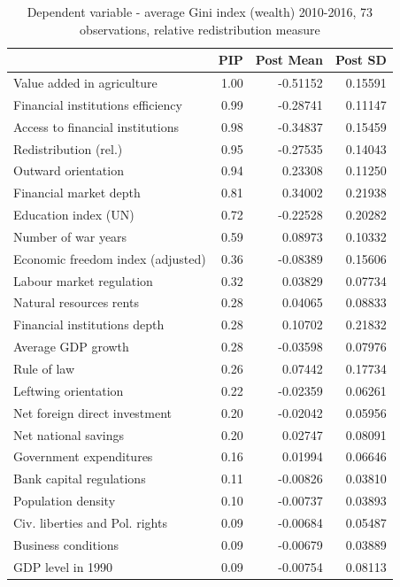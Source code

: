 \documentclass[a4paper,11pt]{article}
\begin{document}
\begin{table}[!ht]
\footnotesize
\centering
\caption{Dependent variable - average Gini index (wealth) 2010-2016, 73 observations, relative redistribution measure}
\label{table:relred}
\begin{tabular}{lrrr}
  \toprule
 & PIP & Post Mean & Post SD \\ 
  \midrule
  Value added in agriculture & 1.00 & -0.51152 & 0.15591 \\ 
  Financial institutions efficiency & 0.99 & -0.28741 & 0.11147 \\ 
  Access to financial institutions & 0.98 & -0.34837 & 0.15459 \\ 
  Redistribution (rel.) & 0.95 & -0.27535 & 0.14043 \\ 
  Outward orientation & 0.94 & 0.23308 & 0.11250 \\ 
  Financial market depth & 0.81 & 0.34002 & 0.21938 \\ 
  Education index (UN) & 0.72 & -0.22528 & 0.20282 \\ 
  Number of war years & 0.59 & 0.08973 & 0.10332 \\ 
  Economic freedom index (adjusted) & 0.36 & -0.08389 & 0.15606 \\ 
  Labour market regulation & 0.32 & 0.03829 & 0.07734 \\ 
  Natural resources rents & 0.28 & 0.04065 & 0.08833 \\ 
  Financial institutions depth & 0.28 & 0.10702 & 0.21832 \\ 
  Average GDP growth & 0.28 & -0.03598 & 0.07976 \\ 
  Rule of law & 0.26 & 0.07442 & 0.17734 \\ 
  Leftwing orientation & 0.22 & -0.02359 & 0.06261 \\ 
  Net foreign direct investment & 0.20 & -0.02042 & 0.05956 \\ 
  Net national savings & 0.20 & 0.02747 & 0.08091 \\ 
  Government expenditures & 0.16 & 0.01994 & 0.06646 \\ 
  Bank capital regulations & 0.11 & -0.00826 & 0.03810 \\ 
  Population density & 0.10 & -0.00737 & 0.03893 \\ 
  Civ. liberties and Pol. rights & 0.09 & -0.00684 & 0.05487 \\ 
  Business conditions & 0.09 & -0.00679 & 0.03889 \\ 
  GDP level in 1990 & 0.09 & -0.00754 & 0.08113 \\ 

\end{tabular}
\end{table}
\end{document}
